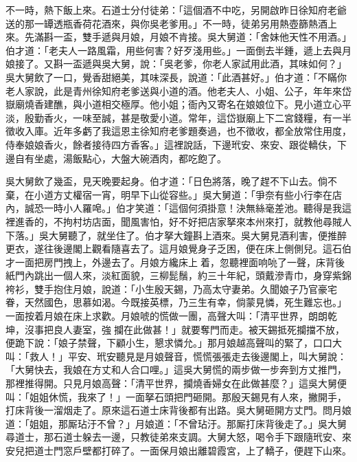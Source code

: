 不一時，熱下飯上來。石道士分付徒弟：「這個酒不中吃，另開啟昨日徐知府老爺送的那一罈透瓶香荷花酒來，與你吳老爹用。」不一時，徒弟另用熱壺篩熱酒上來。先滿斟一盃，雙手遞與月娘，{}月娘不肯接。吳大舅道：「舍妹他天性不用酒。」伯才道：「老夫人一路風霜，用些何害？好歹淺用些。」一面倒去半鍾，遞上去與月娘接了。又斟一盃遞與吳大舅，說：「吳老爹，你老人家試用此酒，其味如何？」吳大舅飲了一口，覺香甜絕美，其味深長，說道：「此酒甚好。」伯才道：「不瞞你老人家說，此是青州徐知府老爹送與小道的酒。他老夫人、小姐、公子，年年來岱嶽廟燒香建醮，與小道相交極厚。他小姐；衙內又寄名在娘娘位下。見小道立心平淡，殷勤香火，一味至誠，甚是敬愛小道。常年，這岱嶽廟上下二宮錢糧，有一半徵收入庫。近年多虧了我這恩主徐知府老爹題奏過，也不徵收，都全放常住用度，侍奉娘娘香火，餘者接待四方香客。」{}這裡說話，下邊玳安、來安、跟從轎伕，下邊自有坐處，湯飯點心，大盤大碗酒肉，都吃飽了。

吳大舅飲了幾盃，見天晚要起身。伯才道：「日色將落，晚了趕不下山去。{}倘不棄，在小道方丈權宿一宵，明早下山從容些。」吳大舅道：「爭奈有些小行李在店內，誠恐一時小人羅唣。」伯才笑道：「這個何須掛意！決無絲毫差池。聽得是我這裡進香的，不拘村坊店面，聞風害怕，好不好把店家拏來本州來打，就教他尋賊人下落。」{}吳大舅聽了，就坐住了。伯才拏大鐘斟上酒來。吳大舅見酒利害，便推醉更衣，{}遂往後邊閣上觀看隨喜去了。這月娘覺身子乏困，便在床上側側兒。這石伯才一面把房門拽上，外邊去了。月娘方纔床上𢱉着，忽聽裡面响喨了一聲，床背後紙門內跳出一個人來，淡紅面貌，三柳髭鬚，約三十年紀，頭戴滲青巾，身穿紫錦袴衫，雙手抱住月娘，說道：「小生殷天錫，乃高太守妻弟。久聞娘子乃官豪宅眷，天然國色，思慕如渴。今既接英標，乃三生有幸，倘蒙見憐，死生難忘也。」{}一面按着月娘在床上求歡。月娘唬的慌做一團，高聲大叫：「清平世界，朗朗乾坤，沒事把良人妻室，強𢺞攔在此做甚！」就要奪門而走。被天錫抵死攔擋不放，便跪下說：「娘子禁聲，下顧小生，懇求憐允。」{}那月娘越高聲叫的緊了，口口大叫：「救人！」平安、玳安聽見是月娘聲音，慌慌張張走去後邊閣上，叫大舅說：「大舅快去，我娘在方丈和人合口哩。」這吳大舅慌的兩步做一步奔到方丈推門，那裡推得開。只見月娘高聲：「清平世界，攔燒香婦女在此做甚麼？」這吳大舅便叫：「姐姐休慌，我來了！」一面拏石頭把門砸開。那殷天錫見有人來，撇開手，打床背後一溜烟走了。原來這石道士床背後都有出路。吳大舅砸開方丈門。問月娘道：「姐姐，那厮玷汙不曾？」月娘道：「不曾玷汙。那厮打床背後走了。」吳大舅尋道士，那石道士躲去一邊，只教徒弟來支調。大舅大怒，喝令手下跟隨玳安、來安兒把道士門窓戶壁都打碎了。一面保月娘出離碧霞宮，上了轎子，便趕下山來。

